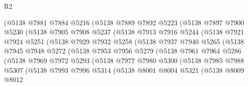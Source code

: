 \begin{lexlean}{R2}
\begin{coremodule}
                (@5138
                  @7881
                  @7884
                  @5216
                  (@5138
                    @7889
                    @7892
                    @5223
                    (@5138
                      @7897
                      @7900
                      @5230
                      (@5138
                        @7905
                        @7908
                        @5237
                        (@5138
                          @7913
                          @7916
                          @5244
                          (@5138
                            @7921
                            @7924
                            @5251
                            (@5138
                              @7929
                              @7932
                              @5258
                              (@5138
                                @7937
                                @7940
                                @5265
                                (@5138
                                  @7945
                                  @7948
                                  @5272
                                  (@5138
                                    @7953
                                    @7956
                                    @5279
                                    (@5138
                                      @7961
                                      @7964
                                      @5286
                                      (@5138
                                        @7969
                                        @7972
                                        @5293
                                        (@5138
                                          @7977
                                          @7980
                                          @5300
                                          (@5138
                                            @7985
                                            @7988
                                            @5307
                                            (@5138
                                              @7993
                                              @7996
                                              @5314
                                              (@5138
                                                @8001
                                                @8004
                                                @5321
                                                (@5138
                                                  @8009
                                                  @8012

\end{coremodule}
\end{lexlean}
